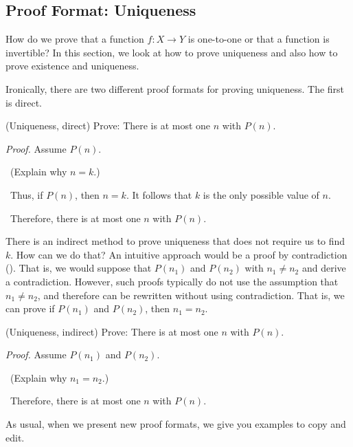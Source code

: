 
\newcommand{\subpffunique}{Proof Format: Uniqueness}
\subsection{\subpffunique}
\label{sub_pff_unique}

How do we prove that a function $f: X \to Y$ is one-to-one or that a function is invertible?  In this section, we look at how to prove uniqueness and also how to prove existence and uniqueness.

Ironically, there are two different proof formats for proving uniqueness. The first is direct.

\begin{pff}(Uniqueness, direct) 
\label{pff_unique_direct} 
    Prove: There is at most one $n$ with $P(n)$.

    \emph{Proof.} Assume $P(n)$. 

    ~\quad (Explain why $n = k$.)

    ~\quad Thus, if $P(n)$, then $n = k$.  It follows that $k$ is the only possible value of $n$.

    ~\quad Therefore, there is at most one $n$ with $P(n)$. 
\end{pff}

There is an indirect method to prove uniqueness that does not require us to find $k$.  How can we do that?  An intuitive approach would be a proof by contradiction ().  That is, we would suppose that $P(n_1)$ and $P(n_2)$ with $n_1 \neq n_2$ and derive a contradiction. However, such proofs typically do not use the assumption that $n_1 \neq n_2$, and therefore can be rewritten without using contradiction. That is, we can prove if  $P(n_1)$ and $P(n_2)$, then $n_1=n_2$.

\begin{pff}(Uniqueness, indirect) 
\label{pff_unique_indirect} 
    Prove: There is at most one $n$ with $P(n)$.

    \emph{Proof.} Assume $P(n_1)$ and $P(n_2)$. 

    ~\quad (Explain why $n_1 = n_2$.)

    ~\quad Therefore, there is at most one $n$ with $P(n)$.    
    \end{pff}

As usual, when we present new proof formats, we give you examples to copy and edit.

